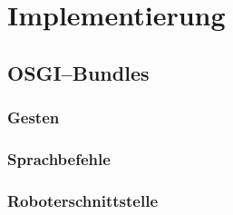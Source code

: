\chapter{Implementierung}
\label{chap:Implementierung}











\section{OSGI--Bundles}

\subsection{Gesten}
\subsection{Sprachbefehle}
\subsection{Roboterschnittstelle}
\label{subsec:Roboterschnittstelle}
